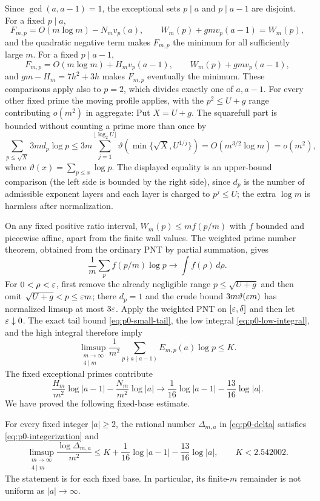 Since $\gcd(a,a-1)=1$, the exceptional sets $p\mid a$ and $p\mid a-1$
are disjoint.  For a fixed $p\mid a$,
\[
 F_{m,p}=O(m\log m)-N_m v_p(a),
 \qquad W_m(p)+gmv_p(a-1)=W_m(p),
\]
and the quadratic negative term makes $F_{m,p}$ the minimum for all
sufficiently large $m$.  For a fixed $p\mid a-1$,
\[
 F_{m,p}=O(m\log m)+H_m v_p(a-1),\qquad
 W_m(p)+gmv_p(a-1),
\]
and $gm-H_m=7h^2+3h$ makes $F_{m,p}$ eventually the minimum.  These
comparisons apply also to $p=2$, which divides exactly one of $a,a-1$.
For every other fixed prime the moving profile applies, with the
$p^2\le U+g$ range contributing $o(m^2)$ in aggregate:
Put $X=U+g$.  The squarefull part is bounded without counting a
prime more than once by
\[
 \sum_{p\le\sqrt X}3m d_p\log p
 \le 3m\sum_{j=1}^{\lfloor\log_2 U\rfloor}
    \vartheta\!\left(\min\{\sqrt X,U^{1/j}\}\right)
 =O(m^{3/2}\log m)=o(m^2),
\]
where $\vartheta(x)=\sum_{p\le x}\log p$.  The displayed equality is an
upper-bound comparison (the left side is bounded by the right side),
since $d_p$ is the number of admissible exponent layers and each layer is
charged to $p^j\le U$; the extra $\log m$ is harmless after normalization.

On any fixed positive ratio interval, $W_m(p)\le m f(p/m)$ with $f$ bounded
and piecewise affine, apart from the finite wall values.  The weighted prime
number theorem, obtained from the ordinary PNT by partial summation, gives
\[
 \frac1m\sum_p f(p/m)\log p\longrightarrow\int f(\rho)\,d\rho.
\]
For $0<\rho<\varepsilon$, first remove the already negligible range
$p\le\sqrt{U+g}$ and then omit $\sqrt{U+g}<p\le\varepsilon m$; there $d_p=1$ and
the crude bound $3m\vartheta(\varepsilon m)$ has normalized limsup at most
$3\varepsilon$.  Apply the weighted PNT on $[\varepsilon,\delta]$ and then let
$\varepsilon\downarrow0$.  The exact
tail bound \eqref{eq:p0-small-tail}, the low integral \eqref{eq:p0-low-integral},
and the high integral therefore imply
\[
 \limsup_{\substack{m\to\infty\\4\mid m}}
 \frac1{m^2}\sum_{p\nmid a(a-1)}E_{m,p}(a)\log p\le K.
\]
The fixed exceptional primes contribute
\[
 \frac{H_m}{m^2}\log|a-1|
 -\frac{N_m}{m^2}\log|a|
 \longrightarrow
 \frac1{16}\log|a-1|-\frac{13}{16}\log|a|.
\]
We have proved the following fixed-base estimate.

\begin{proposition}\label{prop:p0-sharp-arith}
For every fixed integer $|a|\ge2$, the rational number $\Delta_{m,a}$ in
\eqref{eq:p0-delta} satisfies \eqref{eq:p0-integerization} and
\[
 \limsup_{\substack{m\to\infty\\4\mid m}}
 \frac{\log\Delta_{m,a}}{m^2}
 \le K+\frac1{16}\log|a-1|-
             \frac{13}{16}\log|a|,
 \qquad K<2.542002.
\]
The statement is for each fixed base.  In particular, its finite-$m$
remainder is not uniform as $|a|\to\infty$.
\end{proposition}


